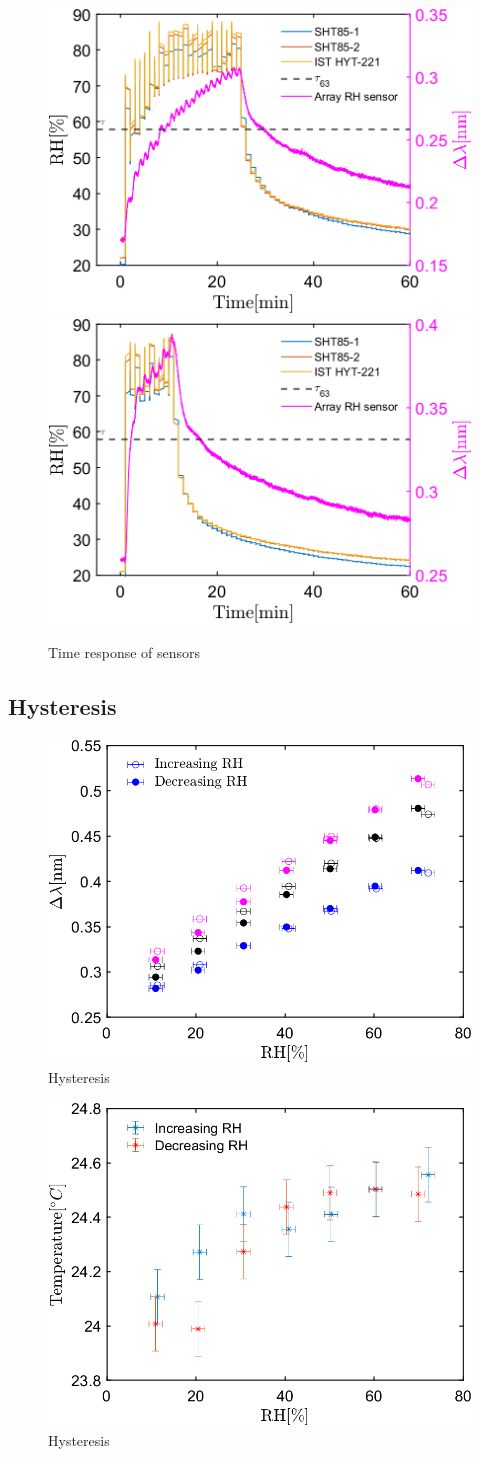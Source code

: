 \begin{figure}[!h]
\centering
\includegraphics[width=0.47\columnwidth]{Chapter5/images/20responseRH2.png}
\includegraphics[width=0.47\columnwidth]{Chapter5/images/020responseRH2.png}
\caption{Time response of sensors}
\label{fig_time_response2}
\end{figure}


\subsection{Hysteresis}

\begin{figure}[!h]
\centering
\includegraphics[width=0.6\columnwidth]{Chapter5/images/25_RHS.png}
\caption{Hysteresis}
\label{fig_hysteresis}
\end{figure}

\begin{figure}[!h]
\centering
\includegraphics[width=0.6\columnwidth]{Chapter5/images/25_RHST.png}
\caption{Hysteresis}
\label{fig_hysteresis2}
\end{figure}



